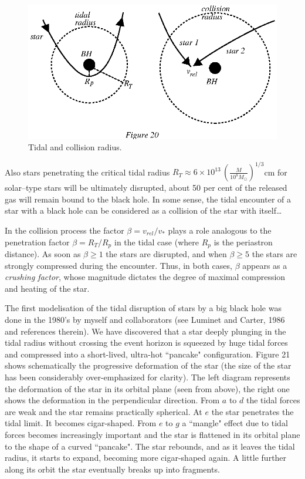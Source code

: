 \documentclass{lamuphys}
\begin{document}
\begin{figure}[tb]
  \begin{center}
    \leavevmode
    \includegraphics{disrup.ps}
    \caption{Tidal and collision radius.}
  \end{center}
\end{figure}
Also stars penetrating the critical tidal radius
$R_{T} \approx 6\times
 10^{13} \, ( \frac{M}{10^{8}M_{\odot}} )^{1/3}$cm for solar--type 
stars will be ultimately disrupted, about 50 per cent of the released gas 
will remain bound to the black hole. In some sense, the tidal encounter 
of a star with a black hole can be considered as a collision of the 
star with itself\ldots 

In the collision process the factor $\beta = v_{rel}/v_{*}$ plays a 
role analogous to the penetration factor $\beta = 
R_{T}/R_{p}$ in the tidal case (where $R_{p}$ is the 
periastron distance). As soon 
as $\beta \geq 1$ the stars are disrupted, and when $\beta \geq 5$ the 
stars are strongly compressed during the encounter. Thus, in both cases,
$\beta$ appears 
as a {\it crushing factor}, whose magnitude dictates the degree of maximal
compression and heating of the star. 

The first modelisation of the tidal disruption of stars by a big 
black hole was done in the 1980's by myself and collaborators 
(see Luminet and Carter, 1986 and references therein). 
We have discovered that a star deeply 
plunging in the tidal radius without crossing the event horizon is 
squeezed by huge tidal forces and compressed into a short-lived, 
ultra-hot ``pancake" 
configuration. Figure 21 shows schematically the progressive 
deformation of the star (the size of the star has been considerably 
over-emphasized for clarity). The left diagram represents the deformation 
of the star in its orbital plane (seen from above), the right one shows 
the deformation in the perpendicular direction. From $a$ to $d$ the 
tidal forces are weak and the star remains practically spherical. At 
$e$ the 
star penetrates the tidal limit. It becomes cigar-shaped. From $e$ 
to $g$ a ``mangle" effect due to tidal forces becomes increasingly important and the 
star is flattened in its orbital plane to the shape of a curved 
``pancake". The star rebounds, and as it leaves the tidal radius, it 
starts to expand, becoming more cigar-shaped again. A little further 
along its orbit the star eventually breaks up into fragments.
\end{document}
